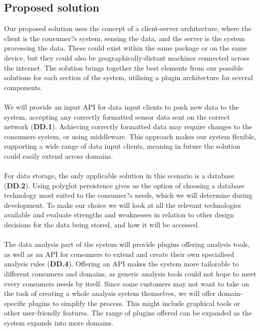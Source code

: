 \documentclass[10pt,a4paper]{article}
\begin{document}
\subsection{Proposed solution}
Our proposed solution uses the concept of a client-server architecture, where the client is the consumer?s system, sensing the data, and the server is the system processing the data. These could exist within the same package or on the same device, but they could also be geographically-distant machines connected across the internet. The solution brings together the best elements from our possible solutions for each section of the system, utilising a plugin architecture for several components.
\\ \\
We will provide an input API for data input clients to push new data to the system, accepting any correctly formatted sensor data sent on the correct network (\textbf{DD.1}). Achieving correctly formatted data may require changes to the consumers system, or using middleware. This approach makes our system flexible, supporting a wide range of data input clients, meaning in future the solution could easily extend across domains.
\\ \\
For data storage, the only applicable solution in this scenario is a database (\textbf{DD.2}). Using polyglot persistence gives us the option of choosing a database technology most suited to the consumer?s needs, which we will determine during development. To make our choice we will look at all the relevant technologies available and evaluate strengths and weaknesses in relation to other design decisions for the data being stored, and how it will be accessed.
\\ \\
The data analysis part of the system will provide plugins offering analysis tools, as well as an API for consumers to extend and create their own specialised analysis rules (\textbf{DD.4}). Offering an API makes the system more tailorable to different consumers and domains, as generic analysis tools could not hope to meet every consumers needs by itself. Since some customers may not want to take on the task of creating a whole analysis system themselves, we will offer domain-specific plugins to simplify the process. This might include graphical tools or other user-friendly features. The range of plugins offered can be expanded as the system expands into more domains.
\\ \\
\end{document}
